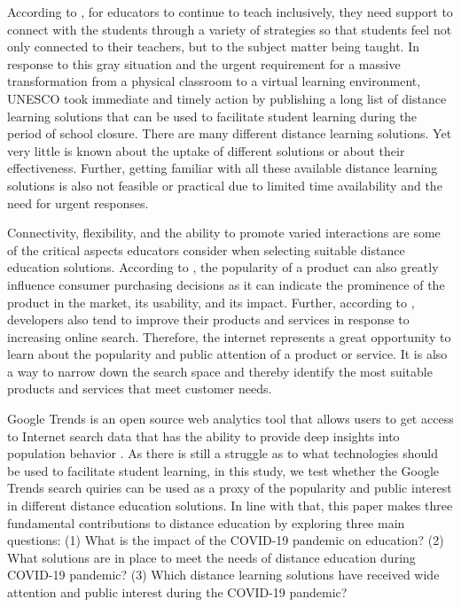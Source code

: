\documentclass[11pt,a4paper,]{article}
\begin{document}
According to \textcite{carter2021teacher}, for educators to continue to teach inclusively, they need support to connect with the students through a variety of strategies so that students feel not only connected to their teachers, but to the subject matter being taught. In response to this gray situation and the urgent requirement for a massive transformation from a physical classroom to a virtual learning environment, UNESCO took immediate and timely action by publishing a long list of distance learning solutions that can be used to facilitate student learning during the period of school closure. There are many different distance learning solutions. Yet very little is known about the uptake of different solutions or about their effectiveness. Further, getting familiar with all these available distance learning solutions is also not feasible or practical due to limited time availability and the need for urgent responses.

Connectivity, flexibility, and the ability to promote varied interactions are some of the critical aspects educators consider when selecting suitable distance education solutions. According to \textcite{ahn2006utilizing}, the popularity of a product can also greatly influence consumer purchasing decisions as it can indicate the prominence of the product in the market, its usability, and its impact. Further, according to \textcite{willis2020using}, developers also tend to improve their products and services in response to increasing online search. Therefore, the internet represents a great opportunity to learn about the popularity and public attention of a product or service. It is also a way to narrow down the search space and thereby identify the most suitable products and services that meet customer needs.

Google Trends is an open source web analytics tool that allows users to get access to Internet search data that has the ability to provide deep insights into population behavior \autocite{nuti2014use}. As there is still a struggle as to what technologies should be used to facilitate student learning, in this study, we test whether the Google Trends search quiries can be used as a proxy of the popularity and public interest in different distance education solutions. In line with that, this paper makes three fundamental contributions to distance education by exploring three main questions: (1) What is the impact of the COVID-19 pandemic on education? (2) What solutions are in place to meet the needs of distance education during COVID-19 pandemic? (3) Which distance learning solutions have received wide attention and public interest during the COVID-19 pandemic?
\end{document}
